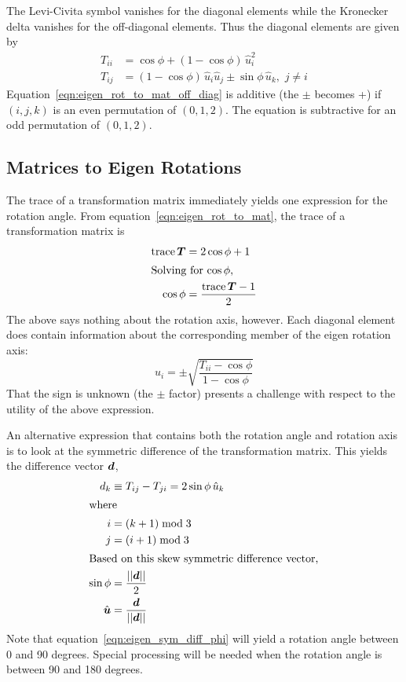 The Levi-Civita symbol vanishes for the diagonal elements while the Kronecker
delta vanishes for the off-diagonal elements. Thus the diagonal elements are
given by
\begin{align}
  \label{eqn:eigen_rot_to_mat_diag}
  T_{ii} &=
     \cos\phi + (1-\cos\phi)\,\hat u_i^2 \\
  \label{eqn:eigen_rot_to_mat_off_diag}
  T_{ij} &=
     (1-\cos\phi)\,\hat u_i \hat u_j \pm
     \sin\phi\,\hat u_k,\,\, j\ne i
\end{align}
Equation~\eqref{eqn:eigen_rot_to_mat_off_diag} is additive
(the $\pm$ becomes +) if $(i,j,k)$ is an even permutation of $(0,1,2)$.
The equation is subtractive for an odd permutation of $(0,1,2)$.

\subsection{Matrices to Eigen Rotations}
The trace of a transformation matrix immediately yields one expression for the
rotation angle.  From equation~\eqref{eqn:eigen_rot_to_mat}, the trace of a
transformation matrix is
\begin{align}
  \label{eqn:eigen_trace}
  \mathop{\rm trace}\nolimits \boldsymbol{T} &= 2\cos\phi + 1 \\
  \intertext{Solving for $\cos\phi$,}
  \label{eqn:eigen_trace_phi}
  \cos\phi &= \frac{\mathop{\rm trace}\nolimits \boldsymbol{T} -1} 2
\end{align}
The above says nothing about the rotation axis, however.
Each diagonal element does contain information about the corresponding
member of the eigen rotation axis:
\begin{equation}
  \label{eqn:eigen_diag_uhat}
  u_i = \pm\sqrt{\frac{T_{ii} - \cos \phi}{1-\cos\phi}}
\end{equation}
That the sign is unknown (the $\pm$ factor) presents a challenge with
respect to the utility of the above expression.

An alternative expression that contains both the rotation angle and rotation
axis is to look at the symmetric difference of the transformation matrix.
This yields the difference vector $\boldsymbol{d}$,
\begin{align}
  \label{eqn:eigen_sym_diff}
  d_k &\equiv T_{ij}-T_{ji} = 2\sin\phi\,\hat u_k \\
  \intertext{where}
  i &= (k+1)\bmod 3 \nonumber \\
  j &= (i+1)\bmod 3 \nonumber \\
  \intertext{Based on this skew symmetric difference vector,}
  \label{eqn:eigen_sym_diff_phi}
  \sin\phi &= \frac{||\boldsymbol{d}||}2 \\
  \label{eqn:eigen_sym_diff_uhat}
  \hat{\boldsymbol{u}} &= \frac {\boldsymbol{d}}{||\boldsymbol{d}||}
\end{align}
Note that equation~\eqref{eqn:eigen_sym_diff_phi} will yield a rotation
angle between 0 and 90 degrees. Special processing will be needed when the
rotation angle is between 90 and 180 degrees.

